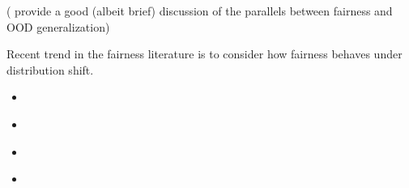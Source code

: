 (\citep{krueger2021out} provide a good (albeit brief) discussion of the parallels between fairness and OOD
generalization)

Recent trend in the fairness literature is to consider how fairness behaves under distribution
shift.
\begin{itemize}
  \item \cite{schrouff2022diagnosing}
  \item \cite{schrouff2022maintaining}
  \item \cite{singh2021fairness}
  \item \cite{slack2020fairness}

\end{itemize}
